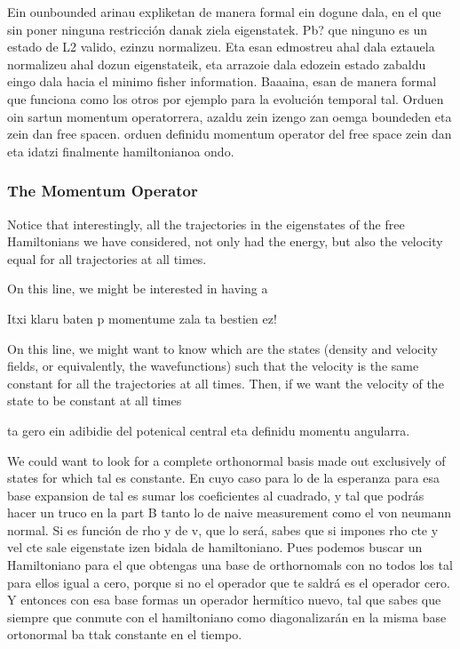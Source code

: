 \documentclass[11pt, a4paper]{article} %
\begin{document}
Ein ounbounded arinau expliketan de manera formal ein dogune dala, en el que sin poner ninguna restricción danak ziela eigenstatek. Pb? que ninguno es un estado de L2 valido, ezinzu normalizeu. Eta esan edmostreu ahal dala eztauela normalizeu ahal dozun eigenstateik, eta arrazoie dala edozein estado zabaldu eingo dala hacia el minimo fisher information. Baaaina, esan de manera formal que funciona como los otros por ejemplo para la evolución temporal tal. Orduen oin sartun momentum operatorrera, azaldu zein izengo zan oemga boundeden eta zein dan free spacen. orduen definidu momentum operator del free space zein dan eta idatzi finalmente hamiltonianoa ondo. 


\subsubsection*{The Momentum Operator}
Notice that interestingly, all the trajectories in the eigenstates of the free Hamiltonians we have considered, not only had the energy, but also the velocity equal for all trajectories at all times.

On this line, we might be interested in having a 

Itxi klaru baten p momentume zala ta bestien ez!

On this line, we might want to know which are the states (density and velocity fields, or equivalently, the wavefunctions) such that the velocity is the same constant for all the trajectories at all times. Then, if we want the velocity of the state to be constant at all times 

ta gero ein adibidie del potenical central eta definidu momentu angularra.

We could want to look for a complete orthonormal basis made out exclusively of states for which tal es constante. En cuyo caso para lo de la esperanza para esa base expansion de tal es sumar los coeficientes al cuadrado, y tal que podrás hacer un truco en la part B tanto lo de naive measurement como el von neumann normal. Si es función de rho y de v, que lo será, sabes que si impones rho cte y vel cte sale eigenstate izen bidala de hamiltoniano. Pues podemos buscar un Hamiltoniano para el que obtengas una base de orthornomals con no todos los tal para ellos igual a cero, porque si no el operador que te saldrá es el operador cero. Y entonces con esa base formas un operador hermítico nuevo, tal que sabes que siempre que conmute con el hamiltoniano como diagonalizarán en la misma base ortonormal ba ttak constante en el tiempo.
\end{document}
